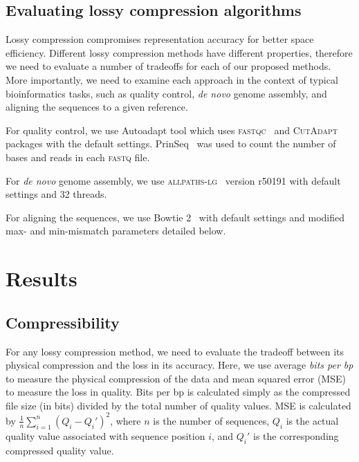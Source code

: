 \documentclass{bioinfo}
\begin{document}
\begin{methods}
\subsection{Evaluating lossy compression algorithms}


Lossy compression compromises representation accuracy for better space efficiency. Different lossy compression methods have different properties, therefore we need to evaluate a number of tradeoffs for each of our proposed methods. More importantly, we need to examine each approach in the context of typical bioinformatics tasks, such as quality control, \emph{de novo} genome assembly, and aligning the sequences to a given reference.

For quality control, we use Autoadapt tool which uses \textsc{fastqc}~\cite{andrews2010fastqc} and \textsc{CutAdapt}~\cite{martin2011cutadapt} packages with the default settings. PrinSeq~\cite{schmieder2011quality} was used to count the number of bases and reads in each \textsc{fastq} file.

For \emph{de novo} genome assembly, we use \textsc{allpaths-lg}~\cite{gnerre2011high} version r50191 with default settings and 32 threads.

For aligning the sequences, we use Bowtie 2~\cite{langmead2012fast} with default settings and modified max- and min-mismatch parameters detailed below.

\end{methods}

\section{Results}

\subsection{Compressibility}

For any lossy compression method, we need to evaluate the tradeoff between its physical compression and the loss in its accuracy.
Here, we use average \emph{bits per bp} to measure the physical compression of the data and mean squared error (MSE) to measure the loss in quality.
Bits per bp is calculated simply as the compressed file size (in bits) divided by the total number of quality values.
MSE is calculated by $\frac{1}{n}\sum_{i=1}^{n}{(Q_i-Q_i')^2}$, where $n$ is the number of sequences, $Q_i$ is the actual quality value associated with sequence position $i$, and $Q_i'$ is the corresponding compressed quality value.
\end{document}
